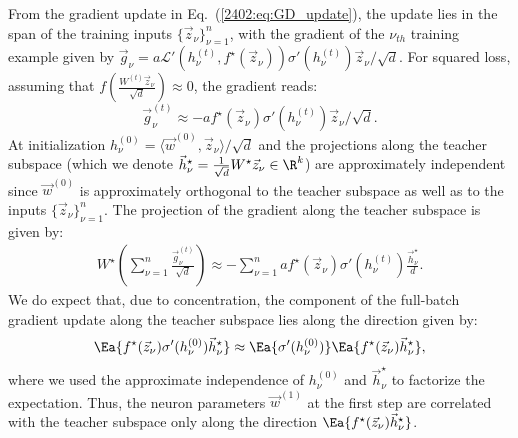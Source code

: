 


From the gradient update in Eq.~(\ref{2402:eq:GD_update}), 
the update lies in the span of the training inputs $\{ \vec{z}_\nu\}_{\nu=1}^n$, with the gradient of the $\nu_{th}$ training example given by $\vec{g}_\nu=a\mathcal{L}'\left(h^{(t)}_\nu,f^\star(\vec z_\nu)\right)\sigma'(h^{(t)}_\nu)\vec z_\nu/\sqrt{d}$. For squared loss, assuming that $f\left( \frac{W^{(t)}\vec z_\nu} {\sqrt{d}}\right) \approx 0$, the gradient reads:
\begin{equation}\label{2402:eq:update_one_example}
    \vec{g}^{(t)}_\nu \approx -a f^\star(\vec z_\nu)\sigma'(h^{(t)}_\nu)\vec z_\nu / \sqrt{d} .
\end{equation}
At initialization $h^{(0)}_\nu=\langle \vec w^{(0)}, \vec z_\nu \rangle / \sqrt{d}$ and the projections along the teacher subspace (which we denote $\vec{h}^\star_{\nu}=\frac{1}{\sqrt{d}} W^\star \vec{z}_\nu \in \R^k$) are approximately independent since $\vec w^{(0)}$ is approximately orthogonal to the teacher subspace as well as to the inputs  $\{ \vec{z}_\nu\}_{\nu=1}^n$. The projection of the gradient along the teacher subspace is given by:
\begin{align}
   W^\star\left(\sum_{\nu=1}^n \frac{\vec{g}^{(t)}_\nu}{\sqrt{d}} \right)  \approx   - \sum_{\nu=1}^n a f^\star(\vec z_\nu)\sigma'(h^{(t)}_\nu) \frac{\vec{h}^\star_{\nu}}{d}  .
\end{align}
We do expect that, due to concentration, the component of the full-batch gradient update along the teacher subspace lies along the direction given by:
\begin{equation}\label{2402:eq:update_first_step}
    \Ea{f^\star(\vec z_\nu)\sigma'(h^{(0)}_\nu)\vec{h}^\star_{\nu}} \approx  \Ea{\sigma'(h^{(0)}_\nu)} \Ea{f^\star(\vec z_\nu)\vec{h}^\star_{\nu}},
\end{equation}
where we used the approximate independence of $h^{(0)}_\nu$ and  $\vec{h}^\star_{\nu}$ to factorize the expectation.
Thus, the neuron parameters $\vec w^{(1)}$ at the first step are correlated with the teacher subspace only along the direction $\Ea{f^\star(\vec z_\nu)\vec{h}^\star_{\nu}}$. 

